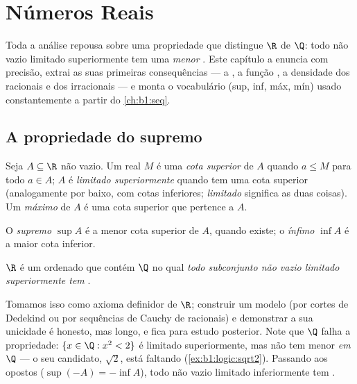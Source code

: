 \chapter{Números Reais}\label{ch:b1:reals}

Toda a análise repousa sobre uma propriedade que distingue $\R$ de
$\Q$: todo  não vazio limitado superiormente tem uma
\emph{menor} . Este capítulo a enuncia com precisão, extrai
as suas primeiras consequências --- a , a
função , a densidade dos racionais e dos irracionais --- e
monta o vocabulário (sup, inf, máx, mín) usado constantemente a partir
do \cref{ch:b1:seq}.

\section{A propriedade do supremo}

\begin{definition}\label{def:b1:reals:bounds}
Seja $A \subseteq \R$ não vazio. Um real $M$ é uma \emph{cota
superior} de $A$ quando $a \leq M$ para todo $a \in A$;
$A$ é \emph{limitado superiormente} quando tem uma cota superior
(analogamente por baixo, com cotas inferiores; \emph{limitado} significa
as duas coisas). Um \emph{máximo} de $A$ é uma cota superior que
pertence a $A$.

O \emph{supremo} $\sup A$ é a menor cota superior
de $A$, quando existe; o \emph{ínfimo} $\inf A$ é
a maior cota inferior.
\end{definition}

\begin{theorem}\label{thm:b1:reals:sup}
$\R$ é um  ordenado que contém $\Q$ no qual \emph{todo
subconjunto não vazio limitado superiormente tem }.
\end{theorem}
\admitted

\begin{remark}
Tomamos isso como axioma definidor de $\R$; construir um modelo (por
cortes de Dedekind ou por sequências de Cauchy de racionais) e
demonstrar a sua unicidade é honesto, mas longo, e fica para estudo
posterior. Note que $\Q$ falha a propriedade: $\{x \in \Q : x^2 < 2\}$ é limitado
superiormente, mas não tem menor  \emph{em $\Q$} --- o seu
candidato, $\sqrt 2$, está faltando (\cref{ex:b1:logic:sqrt2}). Passando aos
opostos ($\sup(-A) = -\inf A$), todo  não vazio limitado inferiormente
tem .
\end{remark}

